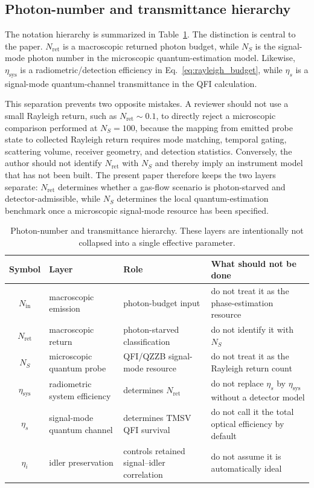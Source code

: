 \documentclass[a4paper,11pt]{article}
\numberwithin{equation}{section}
\newcommand{\Nret}{N_{\mathrm{ret}}}
\newcommand{\Nin}{N_{\mathrm{in}}}
\newcommand{\Ns}{N_{S}}
\newcommand{\etasys}{\eta_{\mathrm{sys}}}
\newcommand{\etas}{\eta_s}
\newcommand{\etai}{\eta_i}
\begin{document}
\subsection{Photon-number and transmittance hierarchy}

The notation hierarchy is summarized in Table~\ref{tab:hierarchy}. The distinction is central to the paper. $\Nret$ is a macroscopic returned photon budget, while $\Ns$ is the signal-mode photon number in the microscopic quantum-estimation model. Likewise, $\etasys$ is a radiometric/detection efficiency in Eq.~\eqref{eq:rayleigh_budget}, while $\etas$ is a signal-mode quantum-channel transmittance in the QFI calculation.

This separation prevents two opposite mistakes. A reviewer should not use a small Rayleigh return, such as $\Nret\sim0.1$, to directly reject a microscopic comparison performed at $\Ns=100$, because the mapping from emitted probe state to collected Rayleigh return requires mode matching, temporal gating, scattering volume, receiver geometry, and detection statistics. Conversely, the author should not identify $\Nret$ with $\Ns$ and thereby imply an instrument model that has not been built. The present paper therefore keeps the two layers separate: $\Nret$ determines whether a gas-flow scenario is photon-starved and detector-admissible, while $\Ns$ determines the local quantum-estimation benchmark once a microscopic signal-mode resource has been specified.

\begin{table}[htbp]
\centering
\caption{Photon-number and transmittance hierarchy. These layers are intentionally not collapsed into a single effective parameter.}
\label{tab:hierarchy}
\small
\begin{tabularx}{\textwidth}{c X X X}
\toprule
Symbol & Layer & Role & What should not be done \\
\midrule
$\Nin$ & macroscopic emission & photon-budget input & do not treat it as the phase-estimation resource \\
$\Nret$ & macroscopic return & photon-starved classification & do not identify it with $\Ns$ \\
$\Ns$ & microscopic quantum probe & QFI/QZZB signal-mode resource & do not treat it as the Rayleigh return count \\
$\etasys$ & radiometric system efficiency & determines $\Nret$ & do not replace $\etas$ by $\etasys$ without a detector model \\
$\etas$ & signal-mode quantum channel & determines TMSV QFI survival & do not call it the total optical efficiency by default \\
$\etai$ & idler preservation & controls retained signal--idler correlation & do not assume it is automatically ideal \\
\bottomrule
\end{tabularx}
\end{table}
\end{document}
